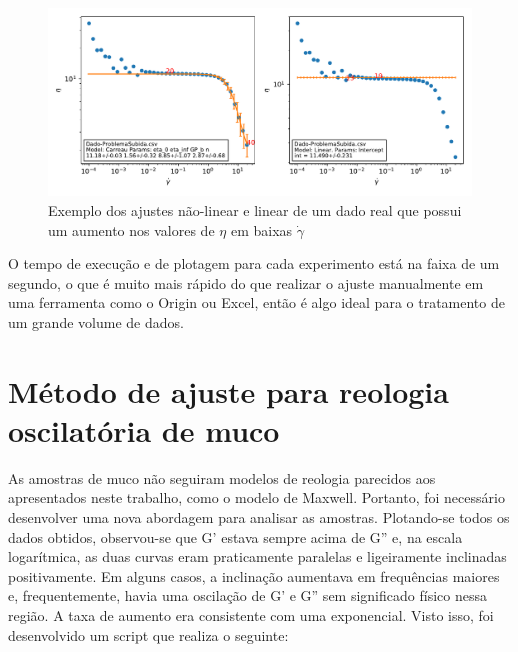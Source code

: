 		\begin{figure}
			\centering
			\includegraphics[width=\textwidth]{imagens/reologia/Dado-ProblemaSubida}
			\caption{Exemplo dos ajustes não-linear e linear de um dado real que possui um aumento nos valores de \(\eta\) em baixas \(\dot{\gamma}\)}
			\label{fig:reologia_dado-problemasubida}
		\end{figure}
		
		O tempo de execução e de plotagem para cada experimento está na faixa de um segundo, o que é muito mais rápido do que realizar o ajuste manualmente em uma ferramenta como o Origin ou Excel, então é algo ideal para o tratamento de um grande volume de dados.
		
		\FloatBarrier

		\section{Método de ajuste para reologia oscilatória de muco}
		
		As amostras de muco não seguiram modelos de reologia parecidos aos apresentados neste trabalho, como o modelo de Maxwell. Portanto, foi necessário desenvolver uma nova abordagem para analisar as amostras. Plotando-se todos os dados obtidos, observou-se que G' estava sempre acima de G'' e, na escala logarítmica, as duas curvas eram praticamente paralelas e ligeiramente inclinadas positivamente. Em alguns casos, a inclinação aumentava em frequências maiores e, frequentemente, havia uma oscilação de G' e G'' sem significado físico nessa região. A taxa de aumento era consistente com uma exponencial. Visto isso, foi desenvolvido um script que realiza o seguinte:
		
